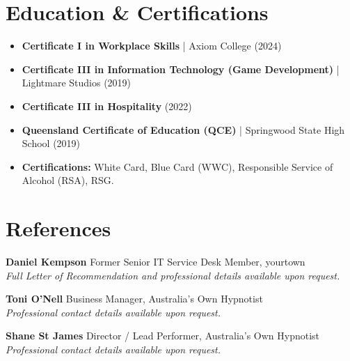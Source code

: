 \documentclass[11pt, a4paper]{article}
\begin{document}
\section{Education \& Certifications}
\begin{itemize}
    \item \textbf{Certificate I in Workplace Skills} | Axiom College (2024)
    \item \textbf{Certificate III in Information Technology (Game Development)} | Lightmare Studios (2019)
    \item \textbf{Certificate III in Hospitality} (2022)
    \item \textbf{Queensland Certificate of Education (QCE)} | Springwood State High School (2019)
    \item \textbf{Certifications:} White Card, Blue Card (WWC), Responsible Service of Alcohol (RSA), RSG.
\end{itemize}

\section{References}

\textbf{Daniel Kempson} \hfill Former Senior IT Service Desk Member, yourtown \\
\textit{Full Letter of Recommendation and professional details available upon request.}

\vspace{6pt}

\textbf{Toni O'Nell} \hfill Business Manager, Australia's Own Hypnotist \\
\textit{Professional contact details available upon request.}

\vspace{6pt}

\textbf{Shane St James} \hfill Director / Lead Performer, Australia's Own Hypnotist \\
\textit{Professional contact details available upon request.}
\end{document}
